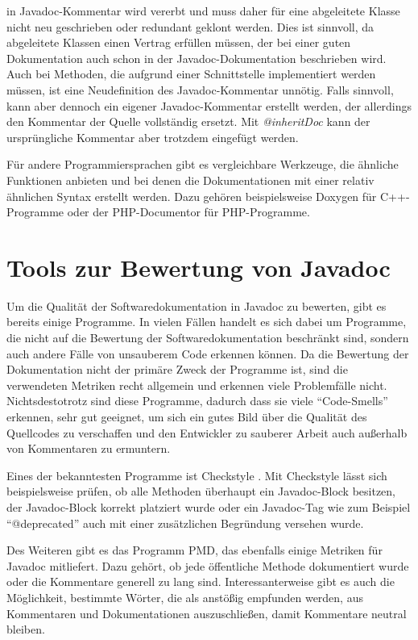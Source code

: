 in Javadoc-Kommentar wird vererbt und muss daher für eine abgeleitete Klasse nicht neu geschrieben oder redundant geklont werden. Dies ist sinnvoll, da abgeleitete Klassen einen Vertrag erfüllen müssen, der bei einer guten Dokumentation auch schon in der Javadoc-Dokumentation beschrieben wird. Auch bei Methoden, die aufgrund einer Schnittstelle implementiert werden müssen, ist eine Neudefinition des Javadoc-Kommentar unnötig. Falls sinnvoll, kann aber dennoch ein eigener Javadoc-Kommentar erstellt werden, der allerdings den Kommentar der Quelle vollständig ersetzt. Mit \textit{@inheritDoc} kann der ursprüngliche Kommentar aber trotzdem eingefügt werden.

Für andere Programmiersprachen gibt es vergleichbare Werkzeuge, die ähnliche Funktionen anbieten und bei denen die Dokumentationen mit einer relativ ähnlichen Syntax erstellt werden. Dazu gehören beispielsweise Doxygen für C++-Programme oder der PHP-Documentor für PHP-Programme. 
\section{Tools zur Bewertung von Javadoc}
Um die Qualität der Softwaredokumentation in Javadoc zu bewerten, gibt es bereits einige Programme. In vielen Fällen handelt es sich dabei um Programme, die nicht auf die Bewertung der Softwaredokumentation beschränkt sind, sondern auch andere Fälle von unsauberem Code erkennen können. Da die Bewertung der Dokumentation nicht der primäre Zweck der Programme ist, sind die verwendeten Metriken recht allgemein und erkennen viele Problemfälle nicht. Nichtsdestotrotz sind diese Programme, dadurch dass sie viele \enquote{Code-Smells} erkennen, sehr gut geeignet, um sich ein gutes Bild über die Qualität des Quellcodes zu verschaffen und den Entwickler zu sauberer Arbeit auch außerhalb von Kommentaren zu ermuntern.

Eines der bekanntesten Programme ist Checkstyle \cite{Checkstyle}. Mit Checkstyle lässt sich beispielsweise prüfen, ob alle Methoden überhaupt ein Javadoc-Block besitzen, der Javadoc-Block korrekt platziert wurde oder ein Javadoc-Tag wie zum Beispiel \enquote{@deprecated} auch mit einer zusätzlichen Begründung versehen wurde. 

Des Weiteren gibt es das Programm PMD\cite{PMD}, das ebenfalls einige Metriken für Javadoc mitliefert. Dazu gehört, ob jede öffentliche Methode dokumentiert wurde oder die Kommentare generell zu lang sind. Interessanterweise gibt es auch die Möglichkeit, bestimmte Wörter, die als anstößig empfunden werden, aus Kommentaren und Dokumentationen auszuschließen, damit Kommentare neutral bleiben. 

